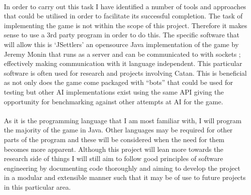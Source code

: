 \documentclass[]{article}
\begin{document}
\paragraph{}
In order to carry out this task I have identified a number of tools and approaches that could be utilised in order to facilitate its successful completion. The task of implementing the game is not within the scope of this project. Therefore it makes sense to use a 3rd party program in order to do this. The specific software that will allow this is `JSettlers' an opensource Java implementation of the game by Jeremy Monin that runs as a server and can be communicated to with sockets \autocite{moninJsettlers}; effectively making communication with it language independent. This particular software is often used for research and projects involving Catan. This is beneficial as not only does the game come packaged with ``bots'' that could be used for testing but other AI implementations exist using the same API giving the opportunity for benchmarking against other attempts at AI for the game.

\paragraph{}
As it is the programming language that I am most familiar with, I will program the majority of the game in Java. Other languages may be required for other parts of the program and these will be considered when the need for them becomes more apparent. Although this project will lean more towards the research side of things I will still aim to follow good principles of software engineering by documenting code thoroughly and aiming to develop the project in a modular and extensible manner such that it may be of use to future projects in this particular area. 
\end{document}
